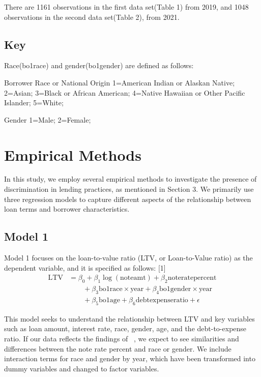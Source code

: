 \documentclass[12pt,english]{article}
\begin{document}
There are 1161 observations in the first data set(Table 1) from 2019, and 1048 observations in the second data set(Table 2), from 2021. 
\subsection{Key}
Race(bo1race) and gender(bo1gender) are defined as follows: 

Borrower Race or National Origin
1=American Indian or Alaskan Native; 
2=Asian; 
3=Black or African American; 
4=Native Hawaiian or Other Pacific Islander; 
5=White; 

Gender
1=Male; 
2=Female; 

\section{Empirical Methods}\label{sec:methods}

In this study, we employ several empirical methods to investigate the presence of discrimination in lending practices, as mentioned in Section 3. We primarily use three regression models to capture different aspects of the relationship between loan terms and borrower characteristics.

\subsection{Model 1}
Model 1 focuses on the loan-to-value ratio (LTV, or Loan-to-Value ratio) as the dependent variable, and it is specified as follows:
[1]
\begin{align*}
\text{LTV} &= \beta_0 + \beta_1 \log(\text{noteamt}) + \beta_2 \text{noteratepercent} \\
&\qquad + \beta_3 \text{bo1race} \times \text{year} + \beta_4 \text{bo1gender} \times \text{year} \\
&\qquad + \beta_5 \text{bo1age} + \beta_6 \text{debtexpenseratio} + \epsilon
\end{align*}

This model seeks to understand the relationship between LTV and key variables such as loan amount, interest rate, race, gender, age, and the debt-to-expense ratio. If our data reflects the findings of ~\cite{gupta2022financial}, we expect to see similarities and differences between the note rate percent and race or gender. We include interaction terms for race and gender by year, which have been transformed into dummy variables and changed to factor variables.
\end{document}

